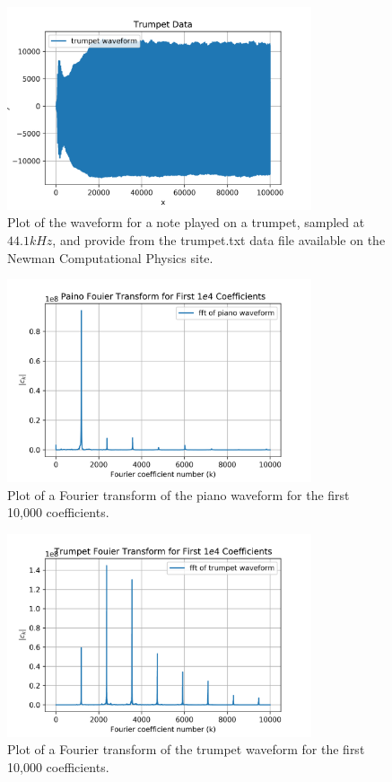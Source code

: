 \documentclass{article}
\begin{document}
\begin{figure}[H]
	\centering
	\includegraphics[width=0.8\textwidth]{../images/trumpet_wave.png}
	\caption{Plot of the waveform for a note played on a trumpet, sampled at $44.1kHz$, and provide from the trumpet.txt data file available on the Newman Computational Physics site.}
	\label{fig:trumpet_wave}
\end{figure}

\begin{figure}[H]
	\centering
	\includegraphics[width=0.8\textwidth]{../images/piano_fft.png}
	\caption{Plot of a Fourier transform of the piano waveform for the first 10,000 coefficients.}
	\label{fig:piano_fft}
\end{figure}

\begin{figure}[H]
	\centering
	\includegraphics[width=0.8\textwidth]{../images/trumpet_fft.png}
	\caption{Plot of a Fourier transform of the trumpet waveform for the first 10,000 coefficients.}
	\label{fig:trumpet_fft}
\end{figure}
\end{document}
